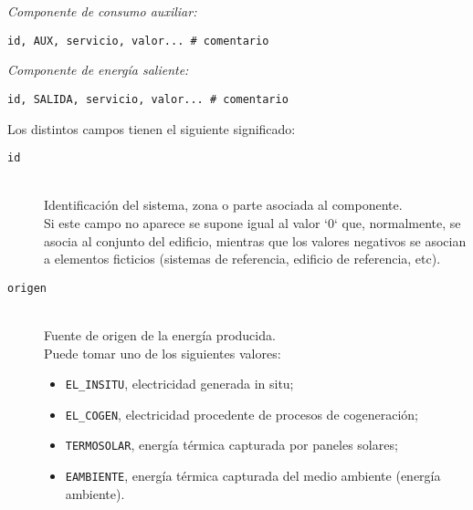 \documentclass[10pt,notitlepage,oneside,a4paper]{article}
\begin{document}
\textit{Componente de consumo auxiliar:}

\begin{lstlisting}
id, AUX, servicio, valor... # comentario
\end{lstlisting}

\textit{Componente de energía saliente:}

\begin{lstlisting}
id, SALIDA, servicio, valor... # comentario
\end{lstlisting}

Los distintos campos tienen el siguiente significado:

\begin{description}
    \item [\texttt{id}] \hfill \\
          Identificación del sistema, zona o parte asociada al componente.\\
          Si este campo no aparece se supone igual al valor `0` que, normalmente, se asocia al conjunto del edificio, mientras que los valores negativos se asocian a elementos ficticios (sistemas de referencia, edificio de referencia, etc).

    \item [\texttt{origen}] \hfill \\
          Fuente de origen de la energía producida.\\
          Puede tomar uno de los siguientes valores:
          \begin{itemize}
              \item \texttt{EL\_INSITU}, electricidad generada in situ;
              \item \texttt{EL\_COGEN}, electricidad procedente de procesos de cogeneración;
              \item \texttt{TERMOSOLAR}, energía térmica capturada por paneles solares;
              \item \texttt{EAMBIENTE}, energía térmica capturada del medio ambiente (energía ambiente).
          \end{itemize}


\end{description}
\end{document}
